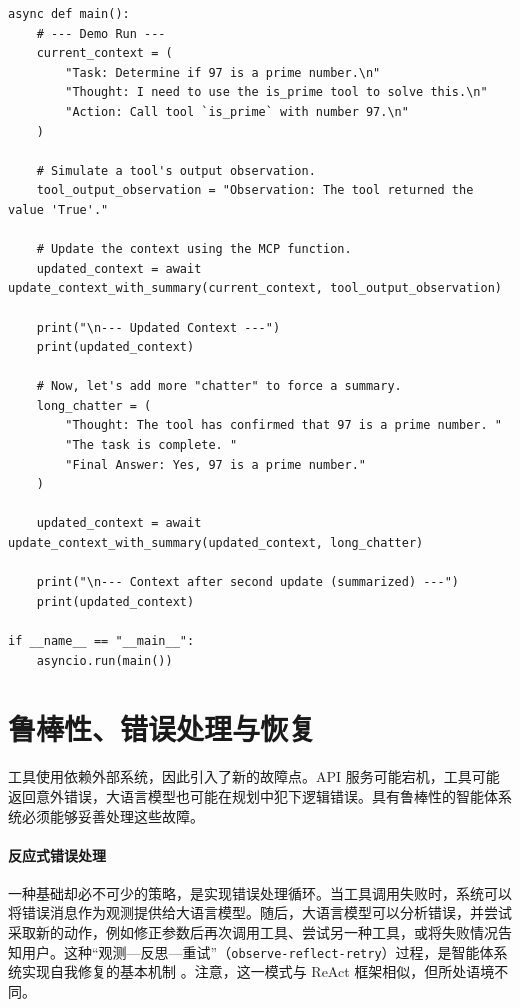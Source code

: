 \begin{listing}
\begin{verbatim}
async def main():
    # --- Demo Run ---
    current_context = (
        "Task: Determine if 97 is a prime number.\n"
        "Thought: I need to use the is_prime tool to solve this.\n"
        "Action: Call tool `is_prime` with number 97.\n"
    )

    # Simulate a tool's output observation.
    tool_output_observation = "Observation: The tool returned the value 'True'."

    # Update the context using the MCP function.
    updated_context = await update_context_with_summary(current_context, tool_output_observation)

    print("\n--- Updated Context ---")
    print(updated_context)

    # Now, let's add more "chatter" to force a summary.
    long_chatter = (
        "Thought: The tool has confirmed that 97 is a prime number. "
        "The task is complete. "
        "Final Answer: Yes, 97 is a prime number."
    )

    updated_context = await update_context_with_summary(updated_context, long_chatter)

    print("\n--- Context after second update (summarized) ---")
    print(updated_context)

if __name__ == "__main__":
    asyncio.run(main())
\end{verbatim}
    \caption{模型上下文协议的简化实现（第 2 部分）。}\label{lst:MCP2}
\end{listing}



\section{鲁棒性、错误处理与恢复}
工具使用依赖外部系统，因此引入了新的故障点。API 服务可能宕机，工具可能返回意外错误，大语言模型也可能在规划中犯下逻辑错误。具有鲁棒性的智能体系统必须能够妥善处理这些故障。

\paragraph{反应式错误处理}
一种基础却必不可少的策略，是实现错误处理循环。当工具调用失败时，系统可以将错误消息作为观测提供给大语言模型。随后，大语言模型可以分析错误，并尝试采取新的动作，例如修正参数后再次调用工具、尝试另一种工具，或将失败情况告知用户。这种“观测—反思—重试”（\texttt{observe-reflect-retry}）过程，是智能体系统实现自我修复的基本机制 \citep{sun2024llmruntimeerrorhandler}。注意，这一模式与 ReAct 框架相似，但所处语境不同。


